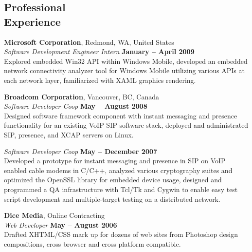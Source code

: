 \documentclass[margin,line]{resume}
\begin{document}
\begin{resume}
    \section{\mysidestyle Professional\\Experience}

    \textbf{Microsoft Corporation}, Redmond, WA, United States \vspace{2mm}\\\vspace{1mm}%
    \textsl{Software Development Engineer Intern} \hfill \textbf{January -- April 2009}\\
    Explored embedded Win32 API within Windows Mobile,
    developed an embedded network connectivity analyzer tool for Windows Mobile utilizing various APIs at each network layer,
    familiarized with XAML graphics rendering.

    \textbf{Broadcom Corporation}, Vancouver, BC, Canada \vspace{2mm}\\\vspace{1mm}%
    \textsl{Software Developer Coop} \hfill \textbf{May -- August 2008}\\
    Designed software framework component with instant messaging and presence functionality for an existing VoIP SIP software stack,
    deployed and administrated SIP, presence, and XCAP servers on Linux.

    \textsl{Software Developer Coop} \hfill \textbf{May -- December 2007}\\
    Developed a prototype for instant messaging and presence in SIP on VoIP enabled cable modems in C/C++,
    analyzed various cryptography suites and optimized the OpenSSL library for embedded device usage,
    designed and programmed a QA infrastructure with Tcl/Tk and Cygwin to enable easy test script development and multiple-target testing on a distributed network.

    \textbf{Dice Media}, Online Contracting \vspace{2mm}\\\vspace{1mm}%
    \textsl{Web Developer} \hfill \textbf{May -- August 2006}\\
    Drafted XHTML/CSS mark up for dozens of web sites from Photoshop design compositions, cross browser and cross platform compatible.


\end{resume}
\end{document}
